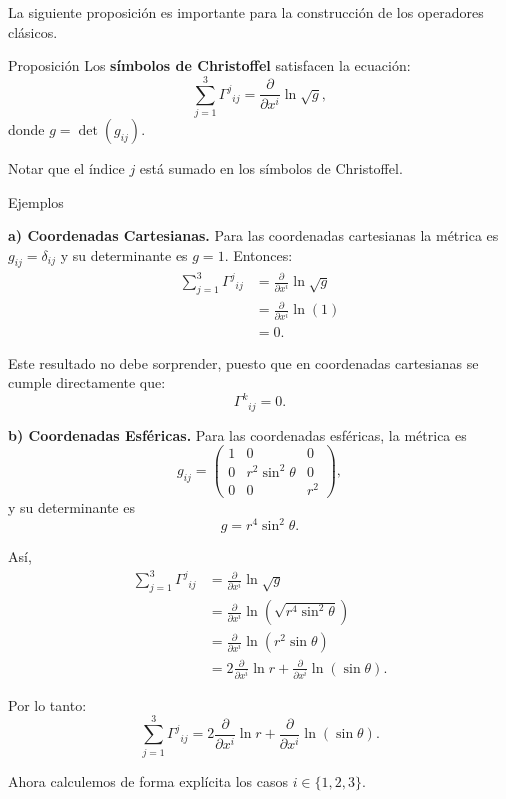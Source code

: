 \documentclass[../apunte_mecanica_clasica.tex]{subfiles}%
\begin{document}
La siguiente proposición es importante para la construcción de los 
operadores clásicos.

\begin{apuntebloque}{Proposición}
Los \textbf{símbolos de Christoffel} satisfacen la ecuación:
\begin{equation*}
    \sum_{j=1}^3 \Gamma^j{}_{ij} 
    = \frac{\partial}{\partial x^i} \ln \sqrt{g},
\end{equation*}
donde $g = \det(g_{ij})$.

\medskip

\end{apuntebloque}

Notar que el índice $j$ está sumado en los símbolos de Christoffel.

\begin{apuntebloque}{Ejemplos}

\textbf{a) Coordenadas Cartesianas.} Para las coordenadas cartesianas la métrica es 
$g_{ij} = \delta_{ij}$ y su determinante es $g = 1$. Entonces:
\begin{align*}
    \sum_{j=1}^3 \Gamma^j{}_{ij} 
    &= \frac{\partial}{\partial x^i} \ln \sqrt{g} \\[6pt]
    &= \frac{\partial}{\partial x^i} \ln(1) \\[6pt]
    &= 0.
\end{align*}

Este resultado no debe sorprender, puesto que en coordenadas 
cartesianas se cumple directamente que:
\[
    \Gamma^k{}_{ij} = 0.
\]

\textbf{b) Coordenadas Esféricas.}  Para las coordenadas esféricas, la métrica es
\[
    g_{ij} =
    \begin{pmatrix}
        1 & 0 & 0 \\
        0 & r^2 \sin^2\theta & 0 \\
        0 & 0 & r^2
    \end{pmatrix},
\]
y su determinante es
\[
    g = r^4 \sin^2\theta.
\]

Así,
\begin{align*}
    \sum_{j=1}^3 \Gamma^j{}_{ij}
    &= \frac{\partial}{\partial x^i} \ln \sqrt{g} \\
    &= \frac{\partial}{\partial x^i} \ln \left(\sqrt{r^4 \sin^2\theta} \right) \\[6pt]
    &= \frac{\partial}{\partial x^i} \ln \left(r^2 \sin\theta \right) \\
    &= 2 \frac{\partial}{\partial x^i} \ln r
       + \frac{\partial}{\partial x^i} \ln \left(\sin\theta\right).
\end{align*}

Por lo tanto:
\begin{equation*}
    \sum_{j=1}^3 \Gamma^j{}_{ij}=2 \frac{\partial}{\partial x^i} \ln r
       + \frac{\partial}{\partial x^i} \ln \left(\sin\theta\right).
\end{equation*}

Ahora calculemos de forma explícita los casos $i\in\{1,2,3\}$.

\end{apuntebloque}
\end{document}
